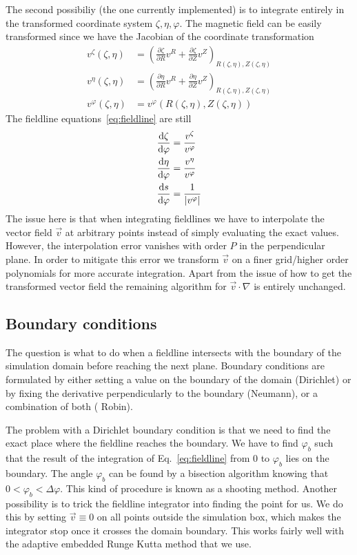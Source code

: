 The second possibiliy (the one currently implemented) 
is to integrate entirely in the 
transformed coordinate system $\zeta, \eta, \varphi$. 
The magnetic field can be easily transformed since we have the
Jacobian of the coordinate transformation
\begin{align}
    v^\zeta(\zeta, \eta) &= \left(\frac{\partial \zeta}{\partial R} v^{R} + \frac{\partial \zeta}{\partial Z}v^Z\right)_{R(\zeta, \eta), Z(\zeta, \eta)} \\
    v^\eta(\zeta, \eta) &= \left(\frac{\partial \eta}{\partial R} v^{R} + \frac{\partial \eta}{\partial Z}v^Z\right)_{R(\zeta, \eta), Z(\zeta, \eta)} \\
    v^\varphi(\zeta, \eta) &= v^\varphi({R(\zeta, \eta), Z(\zeta, \eta)})
    \label{eq:field_trafo}
\end{align}
The fieldline equations~\eqref{eq:fieldline} are still
\begin{subequations}
\begin{align}
\frac{\mathrm{d} \zeta}{\mathrm{d}\varphi} &= \frac{v^\zeta}{v^\varphi}\\
\frac{\mathrm{d} \eta}{\mathrm{d}\varphi} &= \frac{v^\eta}{v^\varphi}\\
\frac{\mathrm{d} s}{\mathrm{d}\varphi} &= \frac{1}{|v^\varphi|}
\end{align}
\label{eq:fieldlines}
\end{subequations}
The issue here is that when integrating fieldlines we
have to interpolate the vector field $\vec v$ at arbitrary points
instead of simply evaluating the exact values.
However, the interpolation error vanishes with order $P$ in the 
perpendicular plane. In order to mitigate this error
we transform $\vec v$ on a finer grid/higher order polynomials for more accurate
integration.
Apart from the issue of how to get the transformed vector field 
the remaining algorithm for $\vec v\cdot\nabla$ is entirely unchanged.

\subsection{Boundary conditions}
The question is what to do when a fieldline intersects with the boundary
of the simulation domain before reaching the next plane.
Boundary conditions are formulated by either setting a value 
on the boundary of the domain (Dirichlet) or by fixing 
the derivative perpendicularly to the boundary (Neumann), or 
a combination of both ( Robin). 

The problem with a Dirichlet boundary condition 
is that we need to find the exact place where the fieldline 
reaches the boundary. 
We have to find
$\varphi_b$ such that the result of the integration of Eq.~\eqref{eq:fieldline} from 
$0$ to $\varphi_b$ lies on the boundary. 
The angle $\varphi_b$ can be found by a bisection algorithm knowing that $0<\varphi_b < \Delta\varphi$. 
This kind of procedure is known as a shooting method. 
Another possibility is to trick the fieldline integrator into finding the point for us. 
We do this by setting $\vec v \equiv 0$ on all points outside the simulation box, which 
makes the integrator stop once it crosses the domain boundary. This works
fairly well with the adaptive embedded Runge Kutta method that we use. 

